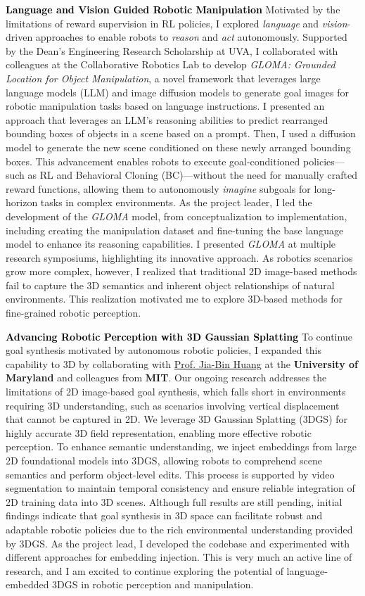 \documentclass[10pt]{article}
\newcommand{\statement}[1]{\medskip\noindent
  \textcolor{black}{\textbf{#1}}\space
}
\begin{document}
\statement{Language and Vision Guided Robotic Manipulation} Motivated by the limitations of reward supervision in RL policies, I explored \textit{language} and \textit{vision}-driven approaches to enable robots to \textit{reason} and \textit{act} autonomously. Supported by the Dean's Engineering Research Scholarship at UVA, I collaborated with colleagues at the Collaborative Robotics Lab to develop \textit{GLOMA: Grounded Location for Object Manipulation}, a novel framework that leverages large language models (LLM) and image diffusion models to generate goal images for robotic manipulation tasks based on language instructions. I presented an approach that leverages an LLM's reasoning abilities to predict rearranged bounding boxes of objects in a scene based on a prompt. Then, I used a diffusion model to generate the new scene conditioned on these newly arranged bounding boxes. This advancement enables robots to execute goal-conditioned policies—such as RL and Behavioral Cloning (BC)—without the need for manually crafted reward functions, allowing them to autonomously \textit{imagine} subgoals for long-horizon tasks in complex environments. As the project leader, I led the development of the \textit{GLOMA} model, from conceptualization to implementation, including creating the manipulation dataset and fine-tuning the base language model to enhance its reasoning capabilities. I presented \textit{GLOMA} at multiple research symposiums, highlighting its innovative approach. As robotics scenarios grow more complex, however, I realized that traditional 2D image-based methods fail to capture the 3D semantics and inherent object relationships of natural environments. This realization motivated me to explore 3D-based methods for fine-grained robotic perception.

\statement{Advancing Robotic Perception with 3D Gaussian Splatting} To continue goal synthesis motivated by autonomous robotic policies, I expanded this capability to 3D by collaborating with \href{https://jbhuang0604.github.io/}{Prof. Jia-Bin Huang} at the \textbf{University of Maryland} and colleagues from \textbf{MIT}. Our ongoing research addresses the limitations of 2D image-based goal synthesis, which falls short in environments requiring 3D understanding, such as scenarios involving vertical displacement that cannot be captured in 2D. We leverage 3D Gaussian Splatting (3DGS) for highly accurate 3D field representation, enabling more effective robotic perception. To enhance semantic understanding, we inject embeddings from large 2D foundational models into 3DGS, allowing robots to comprehend scene semantics and perform object-level edits. This process is supported by video segmentation to maintain temporal consistency and ensure reliable integration of 2D training data into 3D scenes. Although full results are still pending, initial findings indicate that goal synthesis in 3D space can facilitate robust and adaptable robotic policies due to the rich environmental understanding provided by 3DGS. As the project lead, I developed the codebase and experimented with different approaches for embedding injection. This is very much an active line of research, and I am excited to continue exploring the potential of language-embedded 3DGS in robotic perception and manipulation.
\end{document}

